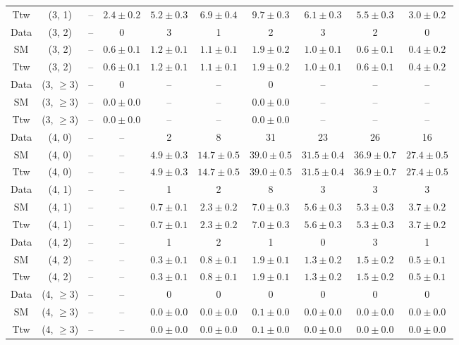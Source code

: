 \begin{table}[h!]
{\begin{tabular}{cccccccccc}
	Ttw & (3, 1) & -- & $2.4\pm 0.2$ & $5.2\pm 0.3$ & $6.9\pm 0.4$ & $9.7\pm 0.3$ & $6.1\pm 0.3$ & $5.5\pm 0.3$ & $3.0\pm 0.2$ \\[0.5ex] 
	Data & (3, 2) & -- & 0 & 3 & 1 & 2 & 3 & 2 & 0 \\[0.5ex] 
	SM & (3, 2) & -- & $0.6\pm 0.1$ & $1.2\pm 0.1$ & $1.1\pm 0.1$ & $1.9\pm 0.2$ & $1.0\pm 0.1$ & $0.6\pm 0.1$ & $0.4\pm 0.2$ \\[0.5ex] 
	Ttw & (3, 2) & -- & $0.6\pm 0.1$ & $1.2\pm 0.1$ & $1.1\pm 0.1$ & $1.9\pm 0.2$ & $1.0\pm 0.1$ & $0.6\pm 0.1$ & $0.4\pm 0.2$ \\[0.5ex] 
	Data & (3, $\ge3$) & -- & 0 & -- & -- & 0 & -- & -- & -- \\[0.5ex] 
	SM & (3, $\ge3$) & -- & $0.0\pm 0.0$ & -- & -- & $0.0\pm 0.0$ & -- & -- & -- \\[0.5ex] 
	Ttw & (3, $\ge3$) & -- & $0.0\pm 0.0$ & -- & -- & $0.0\pm 0.0$ & -- & -- & -- \\[0.5ex] 
	Data & (4, 0) & -- & -- & 2 & 8 & 31 & 23 & 26 & 16 \\[0.5ex] 
	SM & (4, 0) & -- & -- & $4.9\pm 0.3$ & $14.7\pm 0.5$ & $39.0\pm 0.5$ & $31.5\pm 0.4$ & $36.9\pm 0.7$ & $27.4\pm 0.5$ \\[0.5ex] 
	Ttw & (4, 0) & -- & -- & $4.9\pm 0.3$ & $14.7\pm 0.5$ & $39.0\pm 0.5$ & $31.5\pm 0.4$ & $36.9\pm 0.7$ & $27.4\pm 0.5$ \\[0.5ex] 
	Data & (4, 1) & -- & -- & 1 & 2 & 8 & 3 & 3 & 3 \\[0.5ex] 
	SM & (4, 1) & -- & -- & $0.7\pm 0.1$ & $2.3\pm 0.2$ & $7.0\pm 0.3$ & $5.6\pm 0.3$ & $5.3\pm 0.3$ & $3.7\pm 0.2$ \\[0.5ex] 
	Ttw & (4, 1) & -- & -- & $0.7\pm 0.1$ & $2.3\pm 0.2$ & $7.0\pm 0.3$ & $5.6\pm 0.3$ & $5.3\pm 0.3$ & $3.7\pm 0.2$ \\[0.5ex] 
	Data & (4, 2) & -- & -- & 1 & 2 & 1 & 0 & 3 & 1 \\[0.5ex] 
	SM & (4, 2) & -- & -- & $0.3\pm 0.1$ & $0.8\pm 0.1$ & $1.9\pm 0.1$ & $1.3\pm 0.2$ & $1.5\pm 0.2$ & $0.5\pm 0.1$ \\[0.5ex] 
	Ttw & (4, 2) & -- & -- & $0.3\pm 0.1$ & $0.8\pm 0.1$ & $1.9\pm 0.1$ & $1.3\pm 0.2$ & $1.5\pm 0.2$ & $0.5\pm 0.1$ \\[0.5ex] 
	Data & (4, $\ge3$) & -- & -- & 0 & 0 & 0 & 0 & 0 & 0 \\[0.5ex] 
	SM & (4, $\ge3$) & -- & -- & $0.0\pm 0.0$ & $0.0\pm 0.0$ & $0.1\pm 0.0$ & $0.0\pm 0.0$ & $0.0\pm 0.0$ & $0.0\pm 0.0$ \\[0.5ex] 
	Ttw & (4, $\ge3$) & -- & -- & $0.0\pm 0.0$ & $0.0\pm 0.0$ & $0.1\pm 0.0$ & $0.0\pm 0.0$ & $0.0\pm 0.0$ & $0.0\pm 0.0$ \\[0.5ex] 

\end{tabular}}
\end{table}
